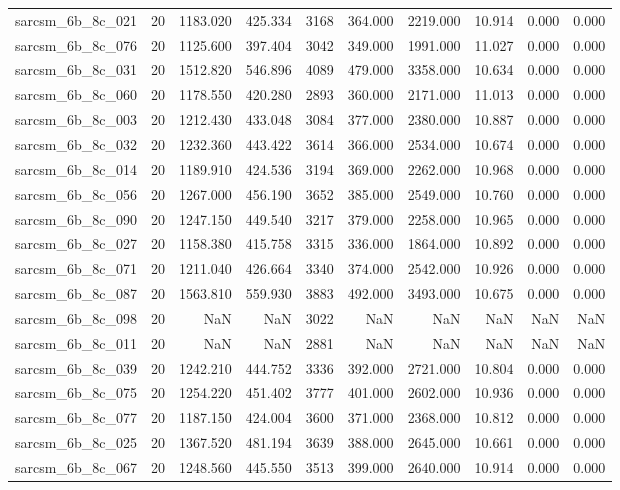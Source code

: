 \begin{tabular}{lrrrrrrrrr}
sarcsm\_6b\_8c\_021 & 20 & 1183.020 & 425.334 & 3168 & 364.000 & 2219.000 & 10.914 & 0.000 & 0.000 \\
sarcsm\_6b\_8c\_076 & 20 & 1125.600 & 397.404 & 3042 & 349.000 & 1991.000 & 11.027 & 0.000 & 0.000 \\
sarcsm\_6b\_8c\_031 & 20 & 1512.820 & 546.896 & 4089 & 479.000 & 3358.000 & 10.634 & 0.000 & 0.000 \\
sarcsm\_6b\_8c\_060 & 20 & 1178.550 & 420.280 & 2893 & 360.000 & 2171.000 & 11.013 & 0.000 & 0.000 \\
sarcsm\_6b\_8c\_003 & 20 & 1212.430 & 433.048 & 3084 & 377.000 & 2380.000 & 10.887 & 0.000 & 0.000 \\
sarcsm\_6b\_8c\_032 & 20 & 1232.360 & 443.422 & 3614 & 366.000 & 2534.000 & 10.674 & 0.000 & 0.000 \\
sarcsm\_6b\_8c\_014 & 20 & 1189.910 & 424.536 & 3194 & 369.000 & 2262.000 & 10.968 & 0.000 & 0.000 \\
sarcsm\_6b\_8c\_056 & 20 & 1267.000 & 456.190 & 3652 & 385.000 & 2549.000 & 10.760 & 0.000 & 0.000 \\
sarcsm\_6b\_8c\_090 & 20 & 1247.150 & 449.540 & 3217 & 379.000 & 2258.000 & 10.965 & 0.000 & 0.000 \\
sarcsm\_6b\_8c\_027 & 20 & 1158.380 & 415.758 & 3315 & 336.000 & 1864.000 & 10.892 & 0.000 & 0.000 \\
sarcsm\_6b\_8c\_071 & 20 & 1211.040 & 426.664 & 3340 & 374.000 & 2542.000 & 10.926 & 0.000 & 0.000 \\
sarcsm\_6b\_8c\_087 & 20 & 1563.810 & 559.930 & 3883 & 492.000 & 3493.000 & 10.675 & 0.000 & 0.000 \\
sarcsm\_6b\_8c\_098 & 20 & NaN & NaN & 3022 & NaN & NaN & NaN & NaN & NaN \\
sarcsm\_6b\_8c\_011 & 20 & NaN & NaN & 2881 & NaN & NaN & NaN & NaN & NaN \\
sarcsm\_6b\_8c\_039 & 20 & 1242.210 & 444.752 & 3336 & 392.000 & 2721.000 & 10.804 & 0.000 & 0.000 \\
sarcsm\_6b\_8c\_075 & 20 & 1254.220 & 451.402 & 3777 & 401.000 & 2602.000 & 10.936 & 0.000 & 0.000 \\
sarcsm\_6b\_8c\_077 & 20 & 1187.150 & 424.004 & 3600 & 371.000 & 2368.000 & 10.812 & 0.000 & 0.000 \\
sarcsm\_6b\_8c\_025 & 20 & 1367.520 & 481.194 & 3639 & 388.000 & 2645.000 & 10.661 & 0.000 & 0.000 \\
sarcsm\_6b\_8c\_067 & 20 & 1248.560 & 445.550 & 3513 & 399.000 & 2640.000 & 10.914 & 0.000 & 0.000 \\

\end{tabular}
